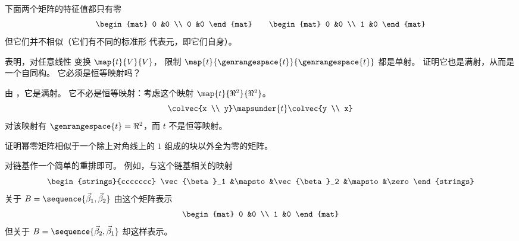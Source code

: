 \begin{exercises}
\begin{answer}
       下面两个矩阵的特征值都只有零
       \begin{equation*}
         \begin{mat}
           0  &0  \\
           0  &0
         \end{mat}
         \qquad
         \begin{mat}
           0  &0  \\
           1  &0
         \end{mat}
       \end{equation*}
       但它们并不相似（它们有不同的标准形
       代表元，即它们自身）。
     \end{answer}
   \item {} 表明，对任意线性
     变换 \( \map{t}{V}{V} \)，
     限制 \( \map{t}{\genrangespace{t}}{\genrangespace{t}} \)
     都是单射。
     证明它也是满射，从而是一个自同构。
     它必须是恒等映射吗？
     \begin{answer}
       由 ，它是满射。
       它不必是恒等映射：考虑这个映射 $\map{t}{\Re^2}{\Re^2}$。
       \begin{equation*}
         \colvec{x \\ y}\mapsunder{t}\colvec{y \\ x}
       \end{equation*}
       对该映射有 $\genrangespace{t}=\Re^2$，而 $t$ 不是恒等映射。
     \end{answer}
   \item
     证明幂零矩阵相似于一个除上对角线上的 $1$ 组成的块以外全为零的矩阵。
     \begin{answer}
       对链基作一个简单的重排即可。
       例如，与这个链基相关的映射
       \begin{equation*}
          \begin{strings}{ccccccc}
             \vec{\beta}_1 &\mapsto &\vec{\beta}_2 &\mapsto &\zero
          \end{strings}
       \end{equation*}
       关于
       $B=\sequence{\vec{\beta}_1,\vec{\beta}_2}$ 由这个矩阵表示
       \begin{equation*}
         \begin{mat}
           0  &0  \\
           1  &0
         \end{mat}
       \end{equation*}
       但关于
       $B=\sequence{\vec{\beta}_2,\vec{\beta}_1}$ 却这样表示。

\end{answer}
\end{exercises}
